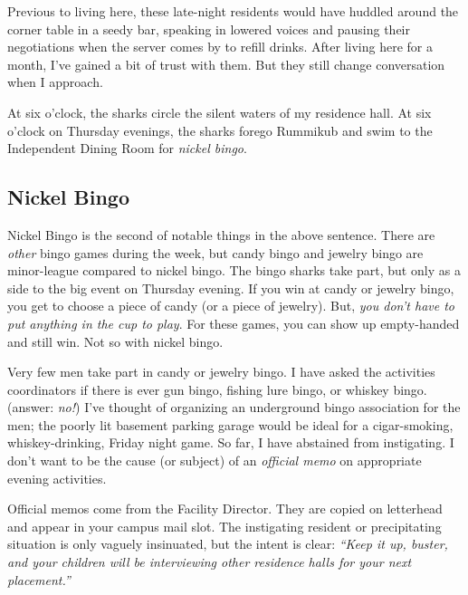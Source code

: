 \documentclass[
  letterpaper,
  DIV=11,
  numbers=noendperiod]{scrartcl}
\begin{document}
Previous to living here, these late-night residents would have huddled
around the corner table in a seedy bar, speaking in lowered voices and
pausing their negotiations when the server comes by to refill drinks.
After living here for a month, I've gained a bit of trust with them. But
they still change conversation when I approach.

At six o'clock, the sharks circle the silent waters of my residence
hall. At six o'clock on Thursday evenings, the sharks forego Rummikub
and swim to the Independent Dining Room for \emph{nickel bingo}.

\hypertarget{nickel-bingo}{%
\subsection{Nickel Bingo}\label{nickel-bingo}}

Nickel Bingo is the second of notable things in the above sentence.
There are \emph{other} bingo games during the week, but candy bingo and
jewelry bingo are minor-league compared to nickel bingo. The bingo
sharks take part, but only as a side to the big event on Thursday
evening. If you win at candy or jewelry bingo, you get to choose a piece
of candy (or a piece of jewelry). But, \emph{you don't have to put
anything in the cup to play}. For these games, you can show up
empty-handed and still win. Not so with nickel bingo.

Very few men take part in candy or jewelry bingo. I have asked the
activities coordinators if there is ever gun bingo, fishing lure bingo,
or whiskey bingo. (answer: \emph{no!}) I've thought of organizing an
underground bingo association for the men; the poorly lit basement
parking garage would be ideal for a cigar-smoking, whiskey-drinking,
Friday night game. So far, I have abstained from instigating. I don't
want to be the cause (or subject) of an \emph{official memo} on
appropriate evening activities.

\begin{tcolorbox}[enhanced jigsaw, bottomrule=.15mm, title={Official Memos}, colbacktitle=quarto-callout-note-color!10!white, left=2mm, leftrule=.75mm, coltitle=black, arc=.35mm, breakable, rightrule=.15mm, opacityback=0, bottomtitle=1mm, colframe=quarto-callout-note-color-frame, toprule=.15mm, toptitle=1mm, titlerule=0mm, opacitybacktitle=0.6, colback=white]
Official memos come from the Facility Director. They are copied on
letterhead and appear in your campus mail slot. The instigating resident
or precipitating situation is only vaguely insinuated, but the intent is
clear: \emph{``Keep it up, buster, and your children will be
interviewing other residence halls for your next placement.''}
\end{tcolorbox}
\end{document}
